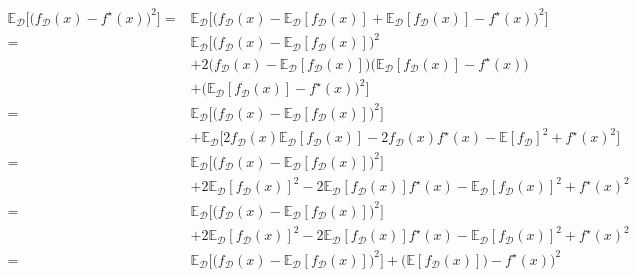 \documentclass[../main.tex]{subfiles}
\begin{document}
\begin{align*}
    \mathbb{E}_\mathcal{D} \big[ \big(
        f_\mathcal{D}(x) - f^\star(x)
    \big)^2 \big]
    = & \mathbb{E}_\mathcal{D} \big[ \big(
        f_\mathcal{D}(x)
        - \mathbb{E}_\mathcal{D}[f_\mathcal{D}(x)]
        + \mathbb{E}_\mathcal{D}[f_\mathcal{D}(x)]
        - f^\star(x)
        \big)^2 \big] \\
    = & \mathbb{E}_\mathcal{D} \big[
        \big( f_\mathcal{D}(x)
        - \mathbb{E}_\mathcal{D}[f_\mathcal{D}(x)] \big)^2 \\
        & + 2 \big( f_\mathcal{D}(x)
        - \mathbb{E}_\mathcal{D}[f_\mathcal{D}(x)] \big)
        \big( \mathbb{E}_\mathcal{D}[f_\mathcal{D}(x)]
        - f^\star(x) \big) \\
        & + \big( \mathbb{E}_\mathcal{D}[f_\mathcal{D}(x)]
        - f^\star(x) \big)^2
        \big] \\
    = & \mathbb{E}_\mathcal{D} \big[
        \big( f_\mathcal{D}(x)
        - \mathbb{E}_\mathcal{D}[f_\mathcal{D}(x)]
        \big)^2 \big] \\
        & + \mathbb{E}_\mathcal{D} \big[
        2 f_\mathcal{D}(x) \mathbb{E}_\mathcal{D}[f_\mathcal{D}(x)]
        - 2 f_\mathcal{D}(x) f^\star(x)
        - \mathbb{E} [f_\mathcal{D}]^2
        + f^\star(x)^2
        \big] \\
    = & \mathbb{E}_\mathcal{D} \big[
        \big( f_\mathcal{D}(x)
        - \mathbb{E}_\mathcal{D}[f_\mathcal{D}(x)]
        \big)^2 \big] \\
        & + 2 \mathbb{E}_\mathcal{D}[f_\mathcal{D}(x)]^2
        - 2 \mathbb{E}_\mathcal{D}[f_\mathcal{D}(x)]f^\star(x)
        - \mathbb{E}_\mathcal{D}[f_\mathcal{D}(x)]^2
        + f^\star(x)^2 \\
    = & \mathbb{E}_\mathcal{D} \big[
        \big( f_\mathcal{D}(x)
        - \mathbb{E}_\mathcal{D}[f_\mathcal{D}(x)]
        \big)^2 \big] \\
        & + 2 \mathbb{E}_\mathcal{D}[f_\mathcal{D}(x)]^2
        - 2 \mathbb{E}_\mathcal{D}[f_\mathcal{D}(x)]f^\star(x)
        - \mathbb{E}_\mathcal{D}[f_\mathcal{D}(x)]^2
        + f^\star(x)^2 \\
    = & \mathbb{E}_\mathcal{D} \big[
        \big( f_\mathcal{D}(x)
        - \mathbb{E}_\mathcal{D}[f_\mathcal{D}(x)]
        \big)^2 \big]
        + \big( \mathbb{E}[f_\mathcal{D}(x)])
        - f^\star(x) \big)^2
\end{align*}
\end{document}
